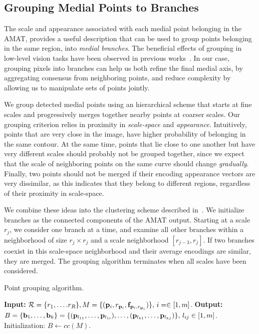 \documentclass[10pt,twocolumn,letterpaper]{article}
\begin{document}
\subsection{Grouping Medial Points to Branches}\label{sec:grouping}
The scale and appearance associated with each medial point belonging in the AMAT, provides a useful
description that can be used to group points belonging in the same region, into \emph{medial branches}.
The beneficial effects of grouping in low-level vision tasks have been
observed in previous works~\cite{felzenszwalb2006min,zhu2007untangling,kokkinos2010highly}.
In our case, grouping pixels into branches can help us both refine the final medial axis, 
by aggregating consensus from neighboring points, and reduce complexity 
by allowing us to manipulate sets of points jointly.

We group detected medial points using an hierarchical scheme that starts at fine scales and
progressively merges together nearby points at coarser scales.
Our grouping criterion relies in proximity in \emph{scale-space} and \emph{appearance}.
Intuitively, points that are very close in the image, have higher probability of belonging in the
same contour.
At the same time, points that lie close to one another but have very different scales should 
probably not be grouped together, since we expect that the scale of neighboring points on the same
curve should change \emph{gradually}.
Finally, two points should not be merged if their encoding appearance vectors are very dissimilar,
as this indicates that they belong to different regions, regardless of their proximity in scale-space.

We combine these ideas into the clustering scheme described in~.
We initialize branches as the connected components of the AMAT output.
Starting at a scale $r_j$, we consider one branch at a time, and examine all other
branches within a neighborhood of size $r_j \times r_j$ and a scale neighborhood $[r_{j-3},r_j]$.
If two branches coexist in this scale-space neighborhood and their average encodings are similar,
they are merged.
The grouping algorithm terminates when all scales have been considered.

\begin{algorithm}
\caption{Point grouping algorithm.}
\label{alg:grouping}
	\begin{algorithmic}[1]
	\Statex \textbf{Input:} $\set{R}=\{ r_1,\ldots.r_R \}, \newline M=\{ (\p{i},r_{\p{i}},\mathbf{f}_{\p{i},r_{\p{i}}}) \}, \, i=\in[1,m]$.
	\Statex \textbf{Output:} $B= \{ \mathbf{b}_1,\ldots,\mathbf{b}_k \} = \newline \{ (\p{l_{11}},\ldots,\p{l_{1i}}), \ldots, (\p{l_{k1}},\ldots,\p{l_{kj}}) \},\, l_{ij}\in[1,m]$.
	\State Initialization: $B \leftarrow cc(M)$. 
		\EndFor
	\EndFor
	\end{algorithmic}
\end{algorithm}
\end{document}
